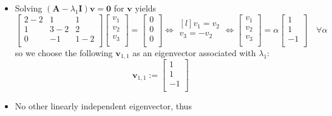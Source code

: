 \documentclass[12pt,a4paper]{article}
\begin{document}
\begin{itemize}
\begin{itemize}
  \item Solving $(\bm{A}-\lambda_{1}\bm{I})\bm{v}=\bm{0}$ for $\bm{v}$ yields
    \begin{equation}\nonumber%
      \begin{bmatrix}
        2-2 & 1 & 1 \\
        1 & 3-2 & 2 \\
        0 & -1 & 1-2 \\
      \end{bmatrix}
      \begin{bmatrix}
        v_{1} \\
        v_{2} \\
        v_{3} \\
      \end{bmatrix}
      = 
      \begin{bmatrix}
        0 \\
        0 \\
        0 \\
      \end{bmatrix}
      \iff
      \begin{matrix*}[l]
        v_{1} = v_{2} \\
        v_{3} = -v_{2} \\
      \end{matrix*}
      \iff
      \begin{bmatrix}
        v_{1} \\
        v_{2} \\
        v_{3} \\
      \end{bmatrix}
      =
      \alpha
      \begin{bmatrix}
        1 \\
        1 \\
        -1 \\
      \end{bmatrix}
      \quad \forall \alpha
    \end{equation}
    so we choose the following $\bm{v}_{1,1}$ as an eigenvector associated with $\lambda_{1}$:
    \begin{equation}\nonumber%
      \bm{v}_{1,1} :=
      \begin{bmatrix}
        1 \\
        1 \\
        -1 \\
      \end{bmatrix}
    \end{equation}
  \item No other linearly independent eigenvector, thus

\end{itemize}
\end{itemize}
\end{document}

